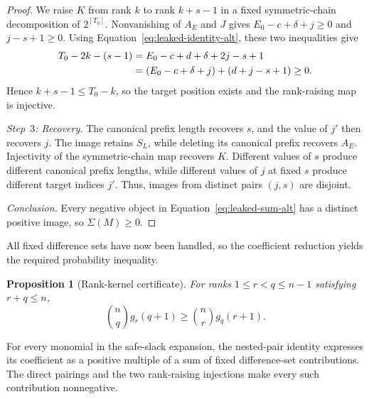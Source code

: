 \documentclass[11pt]{article}
\newtheorem{proposition}[theorem]{Proposition}
\begin{document}
\begin{proof}
We raise $K$ from rank $k$ to rank $k+s-1$ in a fixed symmetric-chain decomposition of $2^{[T_0]}$.
Nonvanishing of $A_E$ and $J$ gives ${E_0-c+\delta+j\geq0}$ and ${j-s+1\geq0}$.
Using Equation~\eqref{eq:leaked-identity-alt}, these two inequalities give
\begin{align}
T_0-2k-(s-1)
&=E_0-c+d+\delta+2j-s+1\notag\\
&=(E_0-c+\delta+j)+(d+j-s+1)\geq0.
\label{eq:leaked-raising-condition-alt}
\end{align}
Hence ${k+s-1\leq T_0-k}$, so the target position exists and the rank-raising map is injective.

\emph{Step~$3$: Recovery.}
The canonical prefix length recovers $s$, and the value of $j'$ then recovers $j$.
The image retains $S_L$, while deleting its canonical prefix recovers $A_E$.
Injectivity of the symmetric-chain map recovers $K$.
Different values of $s$ produce different canonical prefix lengths, while different values of $j$ at fixed $s$ produce different target indices $j'$.
Thus, images from distinct pairs $(j,s)$ are disjoint.

\emph{Conclusion.}
Every negative object in Equation~\eqref{eq:leaked-sum-alt} has a distinct positive image, so ${\Sigma(M)\geq0}$.
\end{proof}

All fixed difference sets have now been handled, so the coefficient reduction yields the required probability inequality.

\begin{proposition}[Rank-kernel certificate]\label{prop:rank-kernel-certificate}
For ranks ${1\leq r<q\leq n-1}$ satisfying ${r+q\leq n}$,
\begin{equation}
\binom nq g_r(q+1)
\geq
\binom nr g_q(r+1).
\label{eq:rank-kernel-certificate-alt}
\end{equation}
\end{proposition}

For every monomial in the safe-slack expansion, the nested-pair identity expresses its coefficient as a positive multiple of a sum of fixed difference-set contributions.
The direct pairings and the two rank-raising injections make every such contribution nonnegative.
\end{document}
